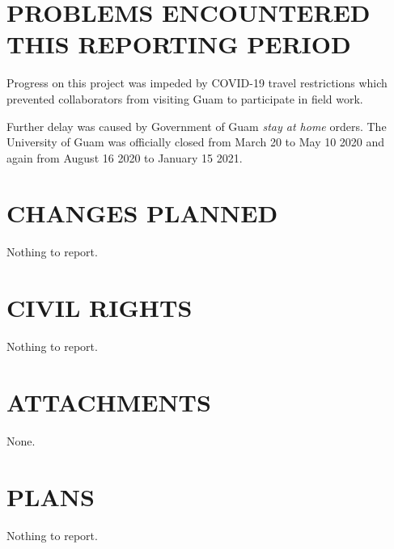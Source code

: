 \documentclass[12pt,letterpaper,english,bibliography=totocnumbered,abstract=on]{scrartcl}
\begin{document}
\section{PROBLEMS ENCOUNTERED THIS REPORTING PERIOD}


Progress on this project was impeded by COVID-19 travel restrictions which prevented collaborators from visiting Guam to participate in field work. 

Further delay was caused by Government of Guam \textit{stay at home} orders. The University of Guam was officially closed from March 20 to May 10 2020 and again from August 16 2020 to January 15 2021.


\section{CHANGES PLANNED}


Nothing to report.


\section{CIVIL RIGHTS}


Nothing to report.

\section{ATTACHMENTS}


None.

\section{PLANS}


Nothing to report.
\end{document}
